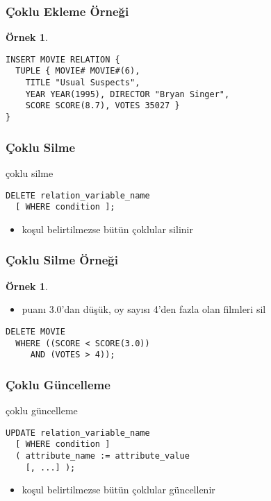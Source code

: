 \documentclass[dvipsnames]{beamer}
\theoremstyle{definition}
\theoremstyle{example}
\newtheorem{ornek}[theorem]{Örnek}
\theoremstyle{plain}
\begin{document}
\begin{frame}[fragile]
  \frametitle{Çoklu Ekleme Örneği}

  \begin{ornek}
    \begin{lstlisting}
INSERT MOVIE RELATION {
  TUPLE { MOVIE# MOVIE#(6),
    TITLE "Usual Suspects",
    YEAR YEAR(1995), DIRECTOR "Bryan Singer",
    SCORE SCORE(8.7), VOTES 35027 }
}
    \end{lstlisting}
  \end{ornek}
\end{frame}

\begin{frame}[fragile]
  \frametitle{Çoklu Silme}

  \begin{block}{çoklu silme}
    \begin{lstlisting}
DELETE relation_variable_name
  [ WHERE condition ];
    \end{lstlisting}
  \end{block}

  \pause
  \begin{itemize}
    \item koşul belirtilmezse bütün çoklular silinir
  \end{itemize}
\end{frame}

\begin{frame}[fragile]
  \frametitle{Çoklu Silme Örneği}

  \begin{ornek}
    \begin{itemize}
      \item puanı 3.0'dan düşük, oy sayısı 4'den fazla olan filmleri sil
    \end{itemize}

    \begin{lstlisting}
DELETE MOVIE
  WHERE ((SCORE < SCORE(3.0))
     AND (VOTES > 4));
    \end{lstlisting}
  \end{ornek}
\end{frame}

\begin{frame}[fragile]
  \frametitle{Çoklu Güncelleme}

  \begin{block}{çoklu güncelleme}
    \begin{lstlisting}
UPDATE relation_variable_name
  [ WHERE condition ]
  ( attribute_name := attribute_value
    [, ...] );
    \end{lstlisting}
  \end{block}

  \pause
  \begin{itemize}
    \item koşul belirtilmezse bütün çoklular güncellenir
  \end{itemize}
\end{frame}
\end{document}
